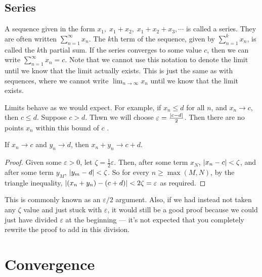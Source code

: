 \documentclass{article}
\begin{document}
\subsection{Series}
A sequence given in the form $x_1,\; x_1 + x_2,\; x_1 + x_2 + x_3, \cdots$ is called a series. They are often written $\sum_{n=1}^\infty x_n$. The $k$th term of the sequence, given by $\sum_{n=1}^k x_n$, is called the $k$th partial sum. If the series converges to some value $c$, then we can write $\sum_{n=1}^\infty x_n = c$. Note that we cannot use this notation to denote the limit until we know that the limit actually exists. This is just the same as with sequences, where we cannot write $\lim_{n\to\infty} x_n$ until we know that the limit exists.

Limits behave as we would expect. For example, if $x_n \leq d$ for all $n$, and $x_n \to c$, then $c \leq d$. Suppose $c > d$. Thwn we will choose $\varepsilon = \frac{\abs{c - d}}{2}$. Then there are no points $x_n$ within this bound of $c$ \contradiction.

\begin{proposition}
	If $x_n \to c$ and $y_n \to d$, then $x_n + y_n \to c + d$.
\end{proposition}
\begin{proof}
	Given some $\varepsilon > 0$, let $\zeta = \frac{1}{2}\varepsilon$. Then, after some term $x_N$, $\abs{x_n - c} < \zeta$, and after some term $y_M$, $\abs{y_m - d} < \zeta$. So for every $n \geq \max(M, N)$, by the triangle inequality, $\abs{(x_n + y_n) - (c + d)} < 2\zeta = \varepsilon$ as required.
\end{proof}
This is commonly known as an $\varepsilon/2$ argument. Also, if we had instead not taken any $\zeta$ value and just stuck with $\varepsilon$, it would still be a good proof because we could just have divided $\varepsilon$ at the beginning --- it's not expected that you completely rewrite the proof to add in this division.

\section{Convergence}
\end{document}

